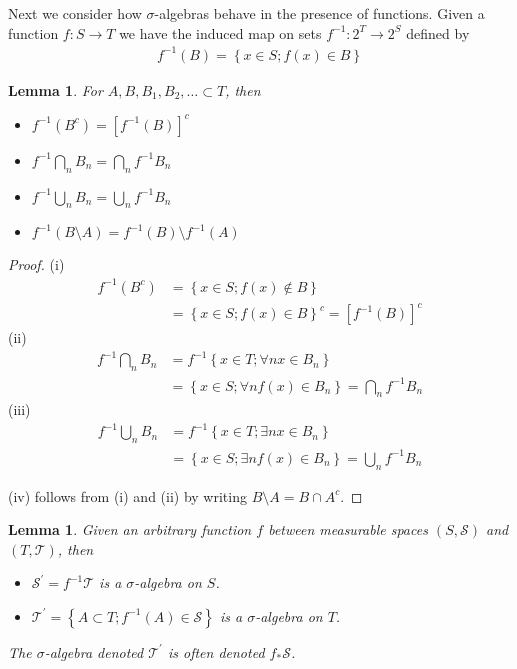 \documentclass{amsart}
\newtheorem{lem}[thm]{Lemma}
\theoremstyle{remark}
\theoremstyle{definition}
\begin{document}
Next we consider how $\sigma$-algebras behave in the presence of
functions.  Given a function $f:S \to T$ we have the induced map on
sets $f^{-1}: 2^T \to 2^S$ defined by 
\begin{align*}
f^{-1}(B) = \left \{x \in S; f(x) \in B \right \}
\end{align*}
\begin{lem}\label{SetOperationsUnderPullback}For $A, B,B_1,B_2,\dots
  \subset T$, then 
\begin{itemize}
\item[(i)] $f^{-1}(B^c) = \left[
    f^{-1}(B) \right ]^c$
\item[(ii)] $f^{-1} \bigcap_n B_n = \bigcap_n f^{-1}
  B_n$
\item[(iii)] $f^{-1} \bigcup_n B_n = \bigcup_n f^{-1}
  B_n$
\item[(iv)]$f^{-1}(B \setminus A) = f^{-1}(B) \setminus f^{-1}(A)$
\end{itemize}
\end{lem}
\begin{proof}
(i)\begin{align*}
f^{-1}(B^c) &= \left \{x \in S; f(x) \notin B \right \} \\
&= \left \{x \in S; f(x) \in B \right \}^c = \left[ f^{-1}(B) \right ]^c
\end{align*}
(ii)\begin{align*}
f^{-1} \bigcap_n B_n &= f^{-1} \left \{x \in T ; \forall n x \in B_n
\right \} \\
& = \left \{x \in S; \forall n f(x) \in B_n \right \} = \bigcap_n f^{-1}  B_n
\end{align*}
(iii)\begin{align*}
f^{-1} \bigcup_n B_n &= f^{-1} \left \{x \in T ; \exists n x \in B_n
\right \} \\
& = \left \{x \in S; \exists n f(x) \in B_n \right \} = \bigcup_n f^{-1}  B_n
\end{align*}

(iv) follows from (i) and (ii) by writing $B \setminus A = B \cap A^c$.
\end{proof}
\begin{lem}\label{SigmaAlgebraPullback}Given an arbitrary function $f$ between measurable spaces
  $(S,\mathcal{S})$ and $(T,\mathcal{T})$, then
\begin{itemize}
\item[(i)] $\mathcal{S}^\prime = f^{-1} \mathcal{T}$ is a
  $\sigma$-algebra on $S$.
\item[(ii)] $\mathcal{T}^\prime = \left \{A \subset T ; f^{-1}(A) \in
      \mathcal{S} \right \}$ is a $\sigma$-algebra on $T$.
\end{itemize}
The $\sigma$-algebra denoted $\mathcal{T}^\prime$ is often denoted
$f_* \mathcal{S}$.
\end{lem}
\end{document}
